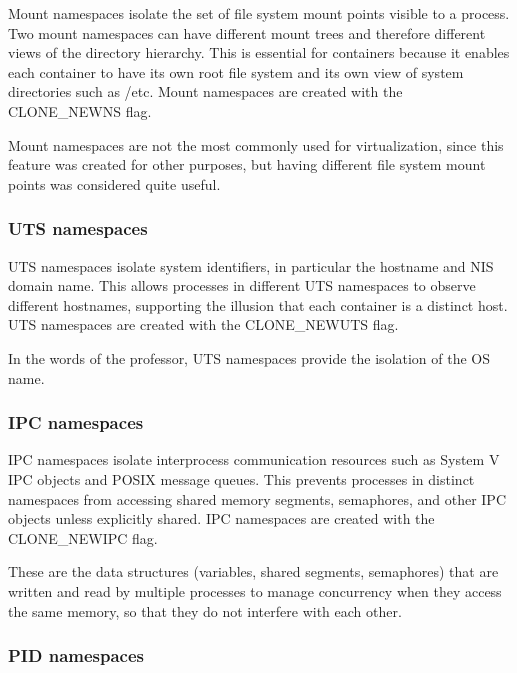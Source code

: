 Mount namespaces isolate the set of file system mount points visible to a process. Two mount namespaces can have different mount trees and therefore different views of the directory hierarchy. This is essential for containers because it enables each container to have its own root file system and its own view of system directories such as /etc. Mount namespaces are created with the CLONE\_NEWNS flag.

Mount namespaces are not the most commonly used for virtualization, since this feature was created for other purposes, but having different file system mount points was considered quite useful.

\subsubsection*{UTS namespaces}

UTS namespaces isolate system identifiers, in particular the hostname and NIS domain name. This allows processes in different UTS namespaces to observe different hostnames, supporting the illusion that each container is a distinct host. UTS namespaces are created with the CLONE\_NEWUTS flag.

In the words of the professor, UTS namespaces provide the isolation of the OS name.

\subsubsection*{IPC namespaces}

IPC namespaces isolate interprocess communication resources such as System V IPC objects and POSIX message queues. This prevents processes in distinct namespaces from accessing shared memory segments, semaphores, and other IPC objects unless explicitly shared. IPC namespaces are created with the CLONE\_NEWIPC flag.

These are the data structures (variables, shared segments, semaphores) that are written and read by multiple processes to manage concurrency when they access the same memory, so that they do not interfere with each other.

\subsubsection*{PID namespaces}

